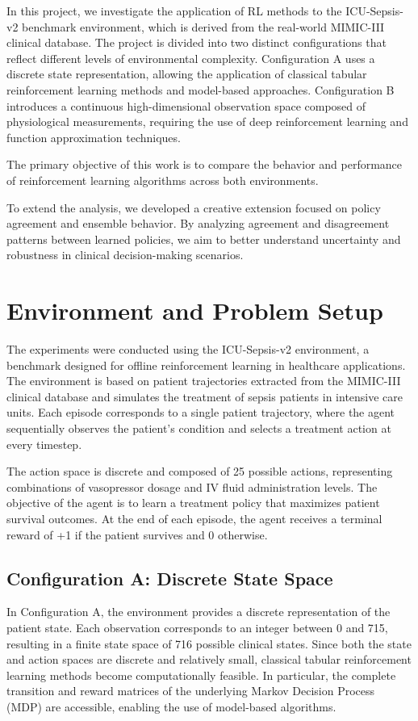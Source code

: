 \documentclass[11pt,a4paper]{article}
\begin{document}
In this project, we investigate the application of RL methods to the ICU-Sepsis-v2 benchmark environment,
which is derived from the real-world MIMIC-III clinical database. 
The project is divided into two distinct configurations that reflect different levels of environmental complexity. 
Configuration A uses a discrete state representation, allowing the application of classical tabular reinforcement learning methods 
and model-based approaches. Configuration B introduces a continuous high-dimensional observation space composed of physiological measurements,
requiring the use of deep reinforcement learning and function approximation techniques.

The primary objective of this work is to compare the behavior and performance of reinforcement learning algorithms across both environments.

To extend the analysis, we developed a creative extension focused on policy agreement and ensemble behavior. 
By analyzing agreement and disagreement patterns between learned policies, 
we aim to better understand uncertainty and robustness in clinical decision-making scenarios.

\section{Environment and Problem Setup}
The experiments were conducted using the ICU-Sepsis-v2 environment, 
a benchmark designed for offline reinforcement learning in healthcare applications. 
The environment is based on patient trajectories extracted from the MIMIC-III clinical database 
and simulates the treatment of sepsis patients in intensive care units. 
Each episode corresponds to a single patient trajectory, 
where the agent sequentially observes the patient’s condition and selects a treatment action at every timestep.

The action space is discrete and composed of 25 possible actions, 
representing combinations of vasopressor dosage and IV fluid administration levels.
The objective of the agent is to learn a treatment policy that maximizes patient survival outcomes. 
At the end of each episode, the agent receives a terminal reward of +1 if the patient survives and 0 otherwise.


\subsection{Configuration A: Discrete State Space}
\label{sec:config_a}
In Configuration A, the environment provides a discrete representation of the patient state. 
Each observation corresponds to an integer between 0 and 715, 
resulting in a finite state space of 716 possible clinical states. 
Since both the state and action spaces are discrete and relatively small, 
classical tabular reinforcement learning methods become computationally feasible.
In particular, 
the complete transition and reward matrices of the underlying Markov Decision Process (MDP) are accessible, 
enabling the use of model-based algorithms.
\end{document}
